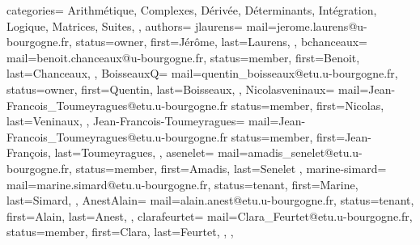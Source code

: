 {
  categories={
    Arithmétique,
    Complexes,
    Dérivée,
    Déterminants,
    Intégration,
    Logique,
    Matrices,
    Suites,
  },
  authors={
    jlaurens={%
      mail=jerome.laurens@u-bourgogne.fr,
      status=owner,
      first=Jérôme,
      last=Laurens,
    },
    bchanceaux={
      mail=benoit.chanceaux@u-bourgogne.fr,
      status=member,
      first=Benoit,
      last=Chanceaux,
    },
    BoisseauxQ={
      mail=quentin_boisseaux@etu.u-bourgogne.fr,
      status=owner,
      first=Quentin,
      last=Boisseaux,
    },
    Nicolasveninaux={
      mail=Jean-Francois_Toumeyragues@etu.u-bourgogne.fr
      status=member,
      first=Nicolas,
      last=Veninaux,
    },
    Jean-Francois-Toumeyragues={
      mail=Jean-Francois_Toumeyragues@etu.u-bourgogne.fr
      status=member,
      first=Jean-François,
      last=Toumeyragues,
    },
    asenelet={
      mail=amadis_senelet@etu.u-bourgogne.fr, 
      status=member,
      first=Amadis,
      last=Senelet
    },
    marine-simard={
      mail=marine.simard@etu.u-bourgogne.fr,
      status=tenant,
      first=Marine,
      last=Simard,
    },  
    AnestAlain={
      mail=alain.anest@etu.u-bourgogne.fr,
      status=tenant,
      first=Alain,
      last=Anest,
    },
    clarafeurtet={
       mail=Clara_Feurtet@etu.u-bourgogne.fr,
       status=member,
       first=Clara,
       last=Feurtet,
     },
  },
}
